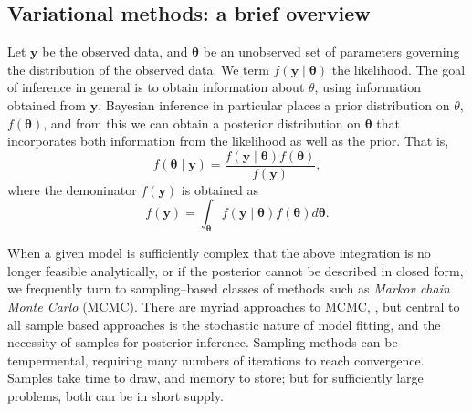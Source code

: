 \subsection{Variational methods: a brief overview}
Let $\bm{y}$ be the observed data, and $\bm{\theta}$ be an unobserved set of 
    parameters governing the distribution of the observed data.  We term 
    $f(\bm{y}\mid\bm{\theta})$ the likelihood.  The goal of inference in 
    general is to obtain information about $\theta$, using information 
    obtained from $\bm{y}$. Bayesian inference in particular places a prior
    distribution on $\theta$, $f(\bm{\theta})$, and from this we can obtain a
    posterior distribution on $\bm{\theta}$ that incorporates both information
    from the likelihood as well as the prior.  That is,
    \[
        f(\bm{\theta}\mid\bm{y}) = 
            \frac{f(\bm{y}\mid\bm{\theta})f(\bm{\theta})}{f(\bm{y})},
    \]
    where the demoninator $f(\bm{y})$ is obtained as
    \[
        f(\bm{y}) = 
            \int_{\bm{\theta}}f(\bm{y}\mid\bm{\theta})f(\bm{\theta})d\bm{\theta}.
    \]

When a given model is sufficiently complex that the above integration is no
    longer feasible analytically, or if the posterior cannot be described in
    closed form, we frequently 
    turn to sampling--based classes of methods such as 
    \emph{Markov chain Monte Carlo} (MCMC)\needcite. There are myriad approaches 
    to MCMC, , but central to all sample
    based approaches is the stochastic nature of model fitting, and the 
    necessity of samples for posterior inference.  Sampling methods can be 
    tempermental, requiring many numbers of iterations to reach convergence.
    Samples take time to draw, and memory to store; but for sufficiently large 
    problems, both can be in short supply.

